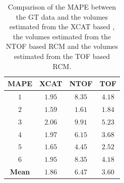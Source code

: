             \begin{table}
                \centering
                
                \captionsetup{singlelinecheck=false, justification=raggedright}
                \caption{Comparison of the \gls{MAPE} between the \gls{GT} data and the volumes estimated from the \gls{XCAT} based , the volumes estimated from the  \gls{NTOF} based \gls{RCM} and the volumes estimated from the  \gls{TOF} based \gls{RCM}.}
                
                \resizebox*{0.75\linewidth}{!}
                {
                    \begin{tabular}{||c|ccc||}
                        \hline
                        \textbf{\gls{MAPE}} & \textbf{XCAT} & \textbf{\gls{NTOF}} & \textbf{\gls{TOF}} \\
                        \hline
                        \textbf{$1$} & $1.95$ & $8.35$ & $4.18$ \\
                        \textbf{$2$} & $1.59$ & $1.61$ & $1.84$ \\
                        \textbf{$3$} & $2.06$ & $9.91$ & $5.23$ \\
                        \textbf{$4$} & $1.97$ & $6.15$ & $3.68$ \\
                        \textbf{$5$} & $1.65$ & $4.45$ & $2.52$ \\
                        \textbf{$6$} & $1.95$ & $8.35$ & $4.18$ \\
                        \hline
                        \textbf{Mean} & $1.86$ & $6.47$ & $3.60$ \\
                        \hline
                    \end{tabular}
                } \label{tab:impact_of_tof_on_respiratory_motion_model_estimation_using_pre_gated_no_intra_cycle_motion_nac_pet_results_mape}
            \end{table}
            
